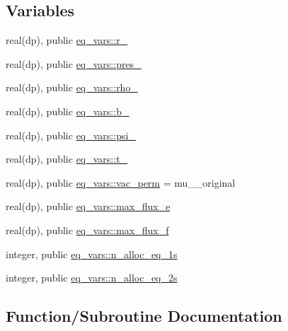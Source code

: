 \subsection*{Variables}
\begin{DoxyCompactItemize}
\item 
real(dp), public \hyperlink{namespaceeq__vars_a0c1f124ab3260a0f6937df9189a18184}{eq\+\_\+vars\+::r\+\_}
\item 
real(dp), public \hyperlink{namespaceeq__vars_abce8bbe23c333a591a2ee5cef9512de9}{eq\+\_\+vars\+::pres\+\_}
\item 
real(dp), public \hyperlink{namespaceeq__vars_a8c9bdb18a418329b9be241342ea704e3}{eq\+\_\+vars\+::rho\+\_}
\item 
real(dp), public \hyperlink{namespaceeq__vars_acdd2464f2282359a818e4159b502e84b}{eq\+\_\+vars\+::b\+\_}
\item 
real(dp), public \hyperlink{namespaceeq__vars_a2bb2594492faa83869c3eaf8cabe521e}{eq\+\_\+vars\+::psi\+\_}
\item 
real(dp), public \hyperlink{namespaceeq__vars_a5170d0b84bb0faf24d5fdcf7c9371620}{eq\+\_\+vars\+::t\+\_}
\item 
real(dp), public \hyperlink{namespaceeq__vars_ac45a3781896236d8c8fe95d920f7337c}{eq\+\_\+vars\+::vac\+\_\+perm} = mu\+\_\+\_\+original
\item 
real(dp), public \hyperlink{namespaceeq__vars_a863feef76ae60309d2e3ed4eed6bd436}{eq\+\_\+vars\+::max\+\_\+flux\+\_\+e}
\item 
real(dp), public \hyperlink{namespaceeq__vars_a46c97bf2a6d6eca952ca5173fcf9cdcb}{eq\+\_\+vars\+::max\+\_\+flux\+\_\+f}
\item 
integer, public \hyperlink{namespaceeq__vars_aed1853ac20f0da0be39ab8ef82993c4d}{eq\+\_\+vars\+::n\+\_\+alloc\+\_\+eq\+\_\+1s}
\item 
integer, public \hyperlink{namespaceeq__vars_af75297445b32de13371da989074dd454}{eq\+\_\+vars\+::n\+\_\+alloc\+\_\+eq\+\_\+2s}
\end{DoxyCompactItemize}


\subsection{Function/\+Subroutine Documentation}
\mbox{\label{eq__vars_8f90_aeb2dafd97b9ec2443da5f6de043d56ff}} 
